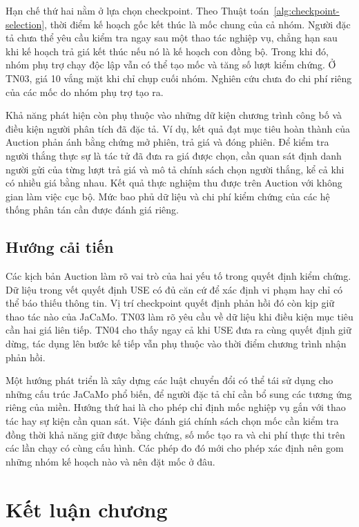 \documentclass[12pt,a4paper,oneside]{extreport}
\begin{document}
Hạn chế thứ hai nằm ở lựa chọn checkpoint. Theo Thuật toán~\ref{alg:checkpoint-selection}, thời điểm kế hoạch gốc kết thúc là mốc chung của cả nhóm. Người đặc tả chưa thể yêu cầu kiểm tra ngay sau một thao tác nghiệp vụ, chẳng hạn sau khi kế hoạch trả giá kết thúc nếu nó là kế hoạch con đồng bộ. Trong khi đó, nhóm phụ trợ chạy độc lập vẫn có thể tạo mốc và tăng số lượt kiểm chứng. Ở TN03, giá 10 vắng mặt khi chỉ chụp cuối nhóm. Nghiên cứu chưa đo chi phí riêng của các mốc do nhóm phụ trợ tạo ra.

Khả năng phát hiện còn phụ thuộc vào những dữ kiện chương trình công bố và điều kiện người phân tích đã đặc tả. Ví dụ, kết quả đạt mục tiêu hoàn thành của Auction phản ánh bằng chứng mở phiên, trả giá và đóng phiên. Để kiểm tra người thắng thực sự là tác tử đã đưa ra giá được chọn, cần quan sát định danh người gửi của từng lượt trả giá và mô tả chính sách chọn người thắng, kể cả khi có nhiều giá bằng nhau. Kết quả thực nghiệm thu được trên Auction với không gian làm việc cục bộ. Mức bao phủ dữ liệu và chi phí kiểm chứng của các hệ thống phân tán cần được đánh giá riêng.

\subsection{Hướng cải tiến}\label{sec:3-5-2}

Các kịch bản Auction làm rõ vai trò của hai yếu tố trong quyết định kiểm chứng. Dữ liệu trong vết quyết định USE có đủ căn cứ để xác định vi phạm hay chỉ có thể báo thiếu thông tin. Vị trí checkpoint quyết định phản hồi đó còn kịp giữ thao tác nào của JaCaMo. TN03 làm rõ yêu cầu về dữ liệu khi điều kiện mục tiêu cần hai giá liên tiếp. TN04 cho thấy ngay cả khi USE đưa ra cùng quyết định giữ dừng, tác dụng lên bước kế tiếp vẫn phụ thuộc vào thời điểm chương trình nhận phản hồi.

Một hướng phát triển là xây dựng các luật chuyển đổi có thể tái sử dụng cho những cấu trúc JaCaMo phổ biến, để người đặc tả chỉ cần bổ sung các tương ứng riêng của miền. Hướng thứ hai là cho phép chỉ định mốc nghiệp vụ gắn với thao tác hay sự kiện cần quan sát. Việc đánh giá chính sách chọn mốc cần kiểm tra đồng thời khả năng giữ được bằng chứng, số mốc tạo ra và chi phí thực thi trên các lần chạy có cùng cấu hình. Các phép đo đó mới cho phép xác định nên gom những nhóm kế hoạch nào và nên đặt mốc ở đâu.

\section{Kết luận chương}\label{sec:3-6}
\end{document}
